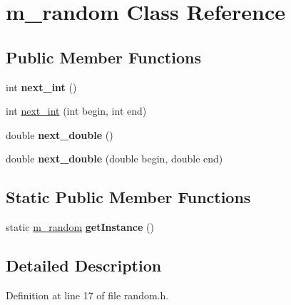 \hypertarget{classm__random}{\section{m\+\_\+random Class Reference}
\label{classm__random}
}
\subsection*{Public Member Functions}
\begin{DoxyCompactItemize}
\item 
\hypertarget{classm__random_a6630d52e758f72ec6a4c8dfa1fca9083}{int {\bfseries next\+\_\+int} ()}\label{classm__random_a6630d52e758f72ec6a4c8dfa1fca9083}

\item 
int \hyperlink{classm__random_af1a647fb56e27ab9b2d674f3e6ec3e0e}{next\+\_\+int} (int begin, int end)
\item 
\hypertarget{classm__random_aa9ed3ee00304e0576a23ff818a20ca92}{double {\bfseries next\+\_\+double} ()}\label{classm__random_aa9ed3ee00304e0576a23ff818a20ca92}

\item 
\hypertarget{classm__random_aca97a8598572524f2e20d29315326d23}{double {\bfseries next\+\_\+double} (double begin, double end)}\label{classm__random_aca97a8598572524f2e20d29315326d23}

\end{DoxyCompactItemize}
\subsection*{Static Public Member Functions}
\begin{DoxyCompactItemize}
\item 
\hypertarget{classm__random_a7c054035013a26415de385873fa302b1}{static \hyperlink{classm__random}{m\+\_\+random} {\bfseries get\+Instance} ()}\label{classm__random_a7c054035013a26415de385873fa302b1}

\end{DoxyCompactItemize}


\subsection{Detailed Description}


Definition at line 17 of file random.\+h.




